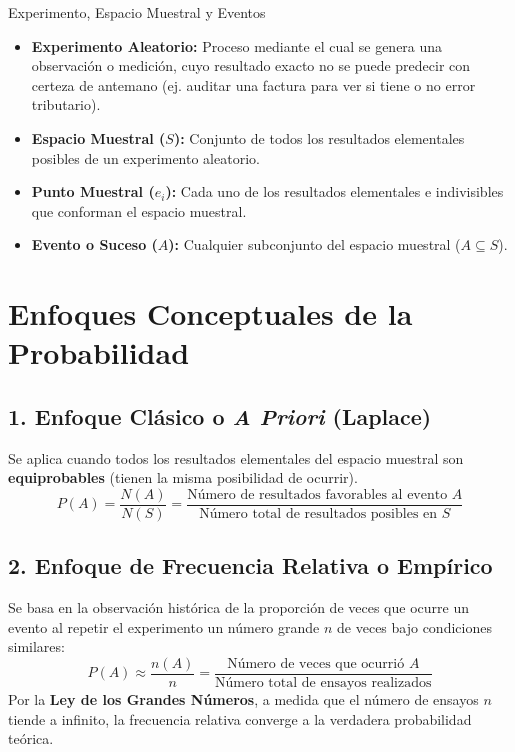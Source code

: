 \begin{definicion}{Experimento, Espacio Muestral y Eventos}
\begin{itemize}
    \item \textbf{Experimento Aleatorio:} Proceso mediante el cual se genera una observación o medición, cuyo resultado exacto no se puede predecir con certeza de antemano (ej. auditar una factura para ver si tiene o no error tributario).
    \item \textbf{Espacio Muestral ($S$):} Conjunto de todos los resultados elementales posibles de un experimento aleatorio.
    \item \textbf{Punto Muestral ($e_i$):} Cada uno de los resultados elementales e indivisibles que conforman el espacio muestral.
    \item \textbf{Evento o Suceso ($A$):} Cualquier subconjunto del espacio muestral ($A \subseteq S$).
\end{itemize}
\end{definicion}

\section{Enfoques Conceptuales de la Probabilidad}

\subsection{1. Enfoque Clásico o \textit{A Priori} (Laplace)}
Se aplica cuando todos los resultados elementales del espacio muestral son \textbf{equiprobables} (tienen la misma posibilidad de ocurrir).
\begin{equation}
    P(A) = \frac{N(A)}{N(S)} = \frac{\text{Número de resultados favorables al evento } A}{\text{Número total de resultados posibles en } S}
\end{equation}

\subsection{2. Enfoque de Frecuencia Relativa o Empírico}
Se basa en la observación histórica de la proporción de veces que ocurre un evento al repetir el experimento un número grande $n$ de veces bajo condiciones similares:
\begin{equation}
    P(A) \approx \frac{n(A)}{n} = \frac{\text{Número de veces que ocurrió } A}{\text{Número total de ensayos realizados}}
\end{equation}
Por la \textbf{Ley de los Grandes Números}, a medida que el número de ensayos $n$ tiende a infinito, la frecuencia relativa converge a la verdadera probabilidad teórica.

